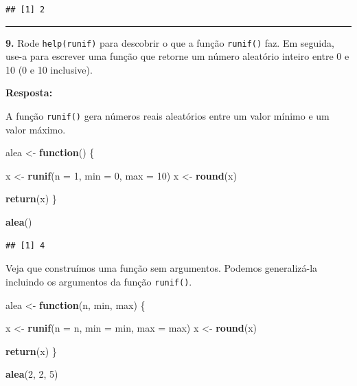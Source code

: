 \documentclass[
]{book}
\newenvironment{Shaded}{\begin{snugshade}}{\end{snugshade}}
\newcommand{\ControlFlowTok}[1]{\textcolor[rgb]{0.13,0.29,0.53}{\textbf{#1}}}
\newcommand{\DataTypeTok}[1]{\textcolor[rgb]{0.13,0.29,0.53}{#1}}
\newcommand{\DecValTok}[1]{\textcolor[rgb]{0.00,0.00,0.81}{#1}}
\newcommand{\KeywordTok}[1]{\textcolor[rgb]{0.13,0.29,0.53}{\textbf{#1}}}
\newcommand{\NormalTok}[1]{#1}
\newcommand{\StringTok}[1]{\textcolor[rgb]{0.31,0.60,0.02}{#1}}
\begin{document}
\begin{verbatim}
## [1] 2
\end{verbatim}

\begin{center}\rule{0.5\linewidth}{0.5pt}\end{center}

\textbf{9.} Rode \texttt{help(runif)} para descobrir o que a função \texttt{runif()} faz. Em seguida, use-a para escrever uma função que retorne um número aleatório inteiro entre 0 e 10 (0 e 10 inclusive).

\textbf{Resposta:}

A função \texttt{runif()} gera números reais aleatórios entre um valor mínimo e um valor máximo.

\begin{Shaded}
\begin{Highlighting}[]
\NormalTok{alea <{-}}\StringTok{ }\ControlFlowTok{function}\NormalTok{() \{}
  
\NormalTok{  x <{-}}\StringTok{ }\KeywordTok{runif}\NormalTok{(}\DataTypeTok{n =} \DecValTok{1}\NormalTok{, }\DataTypeTok{min =} \DecValTok{0}\NormalTok{, }\DataTypeTok{max =} \DecValTok{10}\NormalTok{)}
\NormalTok{  x <{-}}\StringTok{ }\KeywordTok{round}\NormalTok{(x)}
  
  \KeywordTok{return}\NormalTok{(x)}
\NormalTok{\}}

\KeywordTok{alea}\NormalTok{()}
\end{Highlighting}
\end{Shaded}

\begin{verbatim}
## [1] 4
\end{verbatim}

Veja que construímos uma função sem argumentos. Podemos generalizá-la incluindo os argumentos da função \texttt{runif()}.

\begin{Shaded}
\begin{Highlighting}[]
\NormalTok{alea <{-}}\StringTok{ }\ControlFlowTok{function}\NormalTok{(n, min, max) \{}
  
\NormalTok{  x <{-}}\StringTok{ }\KeywordTok{runif}\NormalTok{(}\DataTypeTok{n =}\NormalTok{ n, }\DataTypeTok{min =}\NormalTok{ min, }\DataTypeTok{max =}\NormalTok{ max)}
\NormalTok{  x <{-}}\StringTok{ }\KeywordTok{round}\NormalTok{(x)}
  
  \KeywordTok{return}\NormalTok{(x)}
\NormalTok{\}}

\KeywordTok{alea}\NormalTok{(}\DecValTok{2}\NormalTok{, }\DecValTok{2}\NormalTok{, }\DecValTok{5}\NormalTok{)}
\end{Highlighting}
\end{Shaded}
\end{document}
